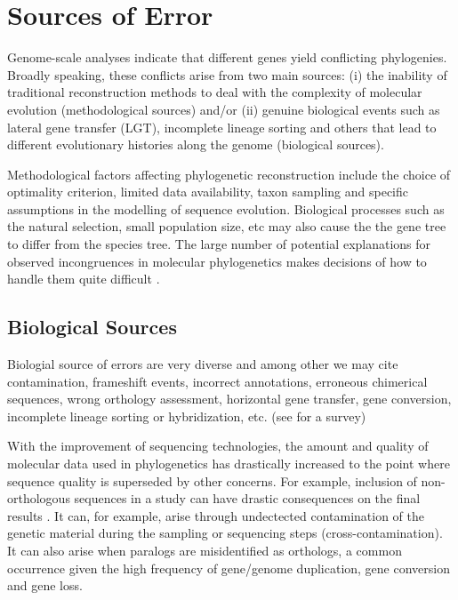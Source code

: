 \section{Sources of Error} \label{sec:error-sources}

%
Genome-scale analyses indicate that different genes yield conflicting phylogenies. Broadly speaking, these conflicts arise from two main sources: (i) the inability of traditional reconstruction methods to deal with the complexity of molecular evolution (methodological sources) and/or (ii) genuine biological events such as lateral gene transfer (LGT), incomplete lineage sorting and others that lead to different evolutionary histories along the genome (biological sources).

Methodological factors affecting phylogenetic reconstruction include the choice of optimality criterion, limited data availability, taxon sampling and specific assumptions in the modelling of sequence evolution. Biological processes such as the natural selection, small population size, etc may also cause the the gene tree to differ from the species tree. The large number of potential explanations for observed incongruences in molecular phylogenetics makes decisions of how to handle them quite difficult \citep{rokas2003genome}.

\subsection{Biological Sources} \label{sec:sampling-error}

Biologial source of errors are very diverse and among other we may cite  contamination,  frameshift  events,  incorrect  annotations,  erroneous  chimerical  sequences,  wrong orthology assessment, horizontal gene transfer, gene conversion, incomplete lineage sorting or hybridization, etc. (see \cite{philippe2017pitfalls} for a survey)

With the improvement of sequencing technologies, the amount and quality of molecular data used in phylogenetics has drastically increased to the point where sequence quality is superseded by other concerns. For example, inclusion of non-orthologous sequences in a study can have drastic consequences on the final results \citep{laurin2012origin,philippe2011resolving}. It can, for example, arise through undectected contamination of the genetic material during the sampling or sequencing steps (cross-contamination). It can also arise when paralogs are misidentified as orthologs, a common occurrence given the high frequency of gene/genome duplication, gene conversion and gene loss.

